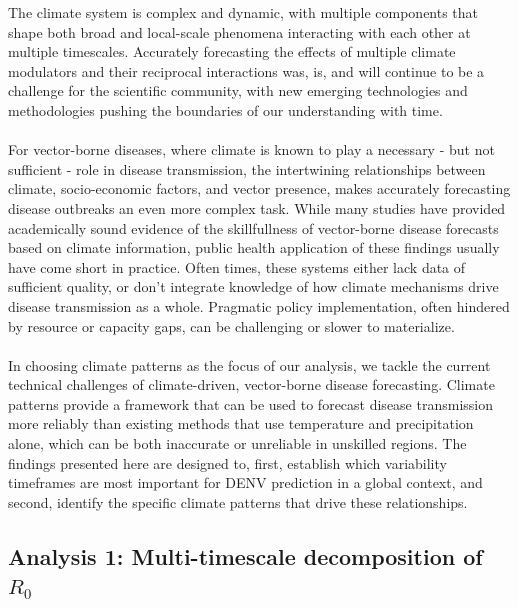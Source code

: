 \documentclass[10pt,twocolumn]{wlscirep}
\begin{document}
The climate system is complex and dynamic, with multiple components that shape both broad and local-scale phenomena interacting with each other at multiple timescales\cite{munoz_2015}. Accurately forecasting the effects of multiple climate modulators and their reciprocal interactions was, is, and will continue to be a challenge for the scientific community, with new emerging technologies and methodologies pushing the boundaries of our understanding with time.
\\
\\
For vector-borne diseases, where climate is known to play a necessary - but not sufficient - role in disease transmission, the intertwining relationships between climate, socio-economic factors, and vector presence, makes accurately forecasting disease outbreaks an even more complex task. While many studies have provided academically sound evidence of the skillfullness of vector-borne disease forecasts based on climate information\cite{lowe_2013}, public health application of these findings usually have come short in practice. Often times, these systems either lack data of sufficient quality, or don't integrate knowledge of how climate mechanisms drive disease transmission as a whole. Pragmatic policy implementation, often hindered by resource or capacity gaps, can be challenging or slower to materialize.
\\
\\
In choosing climate patterns as the focus of our analysis, we tackle the current technical challenges of climate-driven, vector-borne disease forecasting. Climate patterns provide a framework that can be used to forecast disease transmission more reliably than existing methods that use temperature and precipitation alone, which can be both inaccurate or unreliable in unskilled regions. The findings presented here are designed to, first, establish which variability timeframes are most important for DENV prediction in a global context, and second, identify the specific climate patterns that drive these relationships.

\subsection{Analysis 1: Multi-timescale decomposition of $R_0$} \label{sec-discussion-analysis-1}
\end{document}
